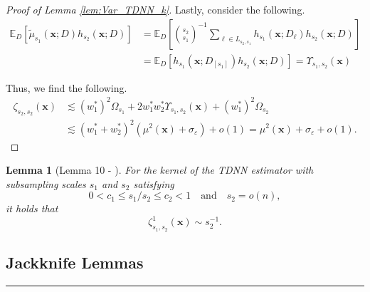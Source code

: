 \documentclass[letterpaper,10pt]{article}
\numberwithin{equation}{section}
\numberwithin{thm}{section}
\newtheorem{lem}{Lemma}
\numberwithin{lem}{section}
\numberwithin{cor}{section}
\newcommand{\E}{\mathbb{E}}
\newcommand{\1}{\mathbbm{1}}
\begin{document}
\begin{proof}[Proof of Lemma \ref{lem:Var_TDNN_k}]
	Lastly, consider the following.
	\begin{equation}
		\begin{aligned}
			\E_{D}\left[\tilde{\mu}_{s_1}\left(\mathbf{x}; D\right) h_{s_2}\left(\mathbf{x}; D\right)\right]
			 & = \E_D\left[\binom{s_2}{s_1}^{-1}\sum_{\ell \in L_{s_2, s_1}} h_{s_1}\left(\mathbf{x}; D_{\ell}\right)h_{s_2}\left(\mathbf{x}; D\right)\right] \\
			 & = \E_D\left[h_{s_1}\left(\mathbf{x}; D_{[s_1]}\right)h_{s_2}\left(\mathbf{x}; D\right)\right]
			= \Upsilon_{s_1, s_2}\left(\mathbf{x}\right)
		\end{aligned}
	\end{equation}

	Thus, we find the following.
	\begin{equation}
		\begin{aligned}
			\zeta_{s_2, s_2}\left(\mathbf{x}\right)
			 & \lesssim \left(w_{1}^{*}\right)^2 \Omega_{s_1}
			+ 2 w_{1}^{*}w_{2}^{*} \Upsilon_{s_1, s_2}\left(\mathbf{x}\right)
			+ \left(w_{1}^{*}\right)^2 \Omega_{s_2}                                                                       \\
			 & \lesssim \left(w_{1}^{*} + w_{2}^{*}\right)^2 \left(\mu^2(\mathbf{x}) + \sigma_{\varepsilon}\right) + o(1)
			= \mu^2(\mathbf{x}) + \sigma_{\varepsilon} + o(1).
		\end{aligned}
	\end{equation}
\end{proof}

\newpage

\begin{lem}[Lemma 10 - \citet{demirkaya_optimal_2024}]\label{lem:dem10}
	For the kernel of the TDNN estimator with subsampling scales $s_1$ and $s_2$ satisfying
	\begin{equation}
		0 < c_1 \leq s_1 / s_2 \leq c_2 < 1
		\quad \text{and} \quad
		s_2 = o(n),
	\end{equation}
	it holds that
	\begin{equation}
		\zeta_{s_1, s_2}^{1}\left(\mathbf{x}\right)
		\sim s_2^{-1}.
	\end{equation}
\end{lem}

\subsection{Jackknife Lemmas}
\hrule
\end{document}
